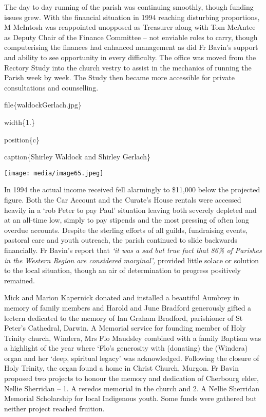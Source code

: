 The day to day running of the parish was continuing smoothly, though funding issues grew. With the financial situation in 1994 reaching disturbing proportions, M McIntosh was reappointed unopposed as Treasurer along with Tom McAntee as Deputy Chair of the Finance Committee -- not enviable roles to carry, though computerising the finances had enhanced management as did Fr Bavin's support and ability to see opportunity in every difficulty. The office was moved from the Rectory Study into the church vestry to assist in the mechanics of running the Parish week by week. The Study then became more accessible for private consultations and counselling.

file\{waldockGerlach.jpg\}

width\{1.\}

position\{c\}

caption\{Shirley Waldock and Shirley Gerlach\}

\texttt{[image: media/image65.jpeg]}

In 1994 the actual income received fell alarmingly to \$11,000 below the projected figure. Both the Car Account and the Curate's House rentals were accessed heavily in a `rob Peter to pay Paul' situation leaving both severely depleted and at an all-time low, simply to pay stipends and the most pressing of often long overdue accounts. Despite the sterling efforts of all guilds, fundraising events, pastoral care and youth outreach, the parish continued to slide backwards financially. Fr Bavin's report that \emph{`it was a sad but true fact that 86\% of Parishes in the Western Region are considered marginal',} provided little solace or solution to the local situation, though an air of determination to progress positively remained.

Mick and Marion Kapernick donated and installed a beautiful Aumbrey in memory of family members and Harold and June Bradford generously gifted a lectern dedicated to the memory of Ian Graham Bradford, parishioner of St Peter's Cathedral, Darwin. A Memorial service for founding member of Holy Trinity church, Windera, Mrs Flo Maudsley combined with a family Baptism was a highlight of the year where `Flo's generosity with (donating) the (Windera) organ and her `deep, spiritual legacy' was acknowledged. Following the closure of Holy Trinity, the organ found a home in Christ Church, Murgon. Fr Bavin proposed two projects to honour the memory and dedication of Cherbourg elder, Nellie Sherridan -- 1. A reredos memorial in the church and 2. A Nellie Sherridan Memorial Scholarship for local Indigenous youth. Some funds were gathered but neither project reached fruition.

